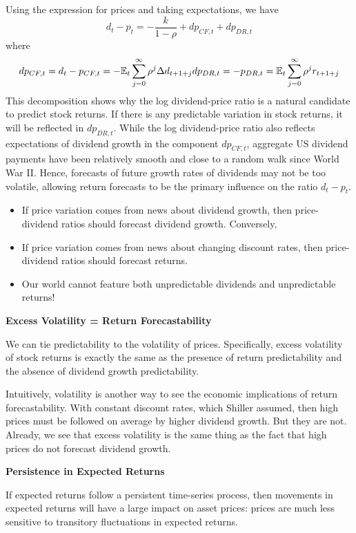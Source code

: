 \documentclass[
]{book}
\providecommand{\tightlist}{%
  \setlength{\itemsep}{0pt}\setlength{\parskip}{0pt}}
\begin{document}
Using the expression for prices and taking expectations, we have
\[
d_{t}-p_{t}=-\frac{k}{1-\rho}+dp_{CF,t}+dp_{DR,t}
\]
where
\[
dp_{CF,t}=d_{t}-p_{CF,t}=-\mathbb{E}_{t}\sum_{j=0}^{\infty}\rho^{j}\Delta d_{t+1+j}\\dp_{DR,t}=-p_{DR,t}=\mathbb{E}_{t}\sum_{j=0}^{\infty}\rho^{j}r_{t+1+j}
\]
This decomposition shows why the log dividend-price ratio is a natural candidate to predict stock returns. If there is any predictable variation in stock returns, it will be reflected in \(dp_{DR,t}\). While the log dividend-price ratio also reflects expectations of dividend growth in the component \(dp_{CF,t}\), aggregate US dividend payments have been relatively smooth and close to a random walk since World War II. Hence, forecasts of future growth rates of dividends may not be too volatile, allowing return forecasts to be the primary influence on the ratio \(d_t-p_t\).

\begin{itemize}
\tightlist
\item
  If price variation comes from news about dividend growth, then price-dividend ratios should forecast dividend growth. Conversely,
\item
  If price variation comes from news about changing discount rates, then price-dividend ratios should forecast returns.
\item
  Our world cannot feature both unpredictable dividends and unpredictable returns!
\end{itemize}

\textbf{Excess Volatility = Return Forecastability}

We can tie predictability to the volatility of prices. Specifically, excess volatility of stock returns is exactly the same as the presence of return predictability and the absence of dividend growth predictability.

Intuitively, volatility is another way to see the economic implications of return forecastability. With constant discount rates, which Shiller assumed, then high prices must be followed on average by higher dividend growth. But they are not. Already, we see that excess volatility is the same thing as the fact that high prices do not forecast dividend growth.

\textbf{Persistence in Expected Returns}

If expected returns follow a persistent time-series process, then movements in expected returns will have a large impact on asset prices: prices are much less sensitive to transitory fluctuations in expected returns.
\end{document}
